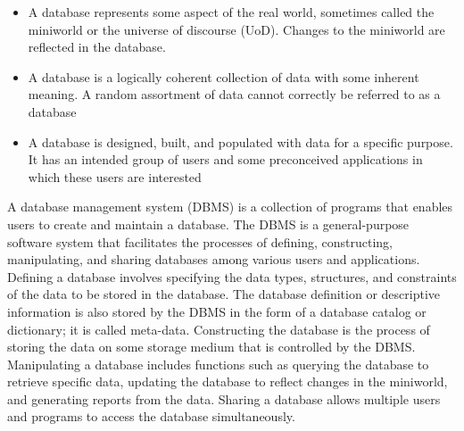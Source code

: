 \begin{itemize}
\item{A database represents some aspect of the real world, sometimes called the miniworld or the universe of discourse (UoD). Changes to the miniworld are reflected in the database.}
\item{A database is a logically coherent collection of data with some inherent meaning. A random assortment of data cannot correctly be referred to as a database}
\item{A database is designed, built, and populated with data for a specific purpose. It has an intended group of users and some preconceived applications in which these users are interested}
\end{itemize}
A database management system (DBMS) is a collection of programs that enables users to create and maintain a database. The DBMS is a general-purpose software system that facilitates the processes of defining, constructing, manipulating, and sharing databases among various users and applications. Defining a database involves specifying the data types, structures, and constraints of the data to be stored in the database. The database definition or descriptive information is also stored by the DBMS in the form of a database catalog or dictionary; it is called meta-data. Constructing the database is the process of storing the data on some storage medium that is controlled by the DBMS. Manipulating a database includes functions such as querying the database to retrieve specific data, updating the database to reflect changes in the miniworld, and generating reports from the data. Sharing a database allows multiple users and programs to access the database simultaneously.

\thispagestyle{fancy}

